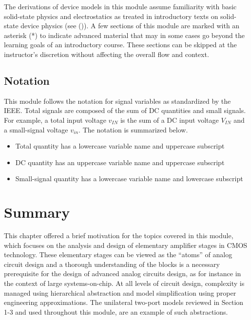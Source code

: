 \documentclass[
  11pt,
  letterpaper,
  abstract]{scrbook}
\begin{document}
The derivations of device models in this module assume familiarity with
basic solid-state physics and electrostatics as treated in introductory
texts on solid-state device physics (see
()). A few sections of this
module are marked with an asterisk (*) to indicate advanced material
that may in some cases go beyond the learning goals of an introductory
course. These sections can be skipped at the instructor's discretion
without affecting the overall flow and context.

\section{Notation}\label{notation}

This module follows the notation for signal variables as standardized by
the IEEE. Total signals are composed of the sum of DC quantities and
small signals. For example, a total input voltage \(v_{IN}\) is the sum
of a DC input voltage \(V_{IN}\) and a small-signal voltage \(v_{in}\).
The notation is summarized below.

\begin{itemize}
\item
  Total quantity has a lowercase variable name and uppercase subscript
\item
  DC quantity has an uppercase variable name and uppercase subscript
\item
  Small-signal quantity has a lowercase variable name and lowercase
  subscript
\end{itemize}

\chapter{Summary}\label{summary}

This chapter offered a brief motivation for the topics covered in this
module, which focuses on the analysis and design of elementary amplifier
stages in CMOS technology. These elementary stages can be viewed as the
``atoms'' of analog circuit design and a thorough understanding of the
blocks is a necessary prerequisite for the design of advanced analog
circuits design, as for instance in the context of large
systems-on-chip. At all levels of circuit design, complexity is managed
using hierarchical abstraction and model simplification using proper
engineering approximations. The unilateral two-port models reviewed in
Section 1-3 and used throughout this module, are an example of such
abstractions.
\end{document}
